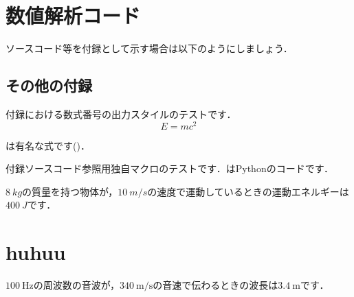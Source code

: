 \appendix
\appendixstyle
\chapter{数値解析コード}\label{appendix:code1}
ソースコード等を付録として示す場合は以下のようにしましょう．

\section{その他の付録}
付録における数式番号の出力スタイルのテストです．
\begin{equation}\label{eq:test_1}
    E=mc^2
\end{equation}

は有名な式です()．

付録ソースコード参照用独自マクロのテストです．はPythonのコードです．

$\SI{8}{kg}$の質量を持つ物体が，$\SI{10}{m/s}$の速度で運動しているときの運動エネルギーは$\SI{400}{J}$です．

\chapter{huhuu}

$\SI{100}{\hertz}$の周波数の音波が，$\SI{340}{\meter/\second}$の音速で伝わるときの波長は$\SI{3.4}{\meter}$です．